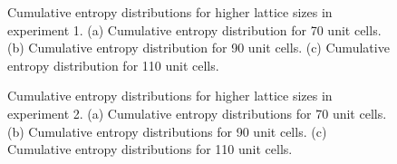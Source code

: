 \documentclass[10pt]{revtex4-1}
\newcommand\SSHOneCumulativeEntropyOneFourZero{./supp_ssh1_140_plot_cumulative_feature_importances.png}
\newcommand\SSHOneCumulativeEntropyOneEightZero{./supp_ssh1_180_plot_cumulative_feature_importances.png}
\newcommand\SSHOneCumulativeEntropyTwoTwoZero{./supp_ssh1_220_plot_cumulative_feature_importances.png}
\newcommand\SSHTwoCumulativeEntropyOneFourZero{./supp_ssh2_140_plot_cumulative_feature_importances.png}
\newcommand\SSHTwoCumulativeEntropyOneEightZero{./supp_ssh2_180_plot_cumulative_feature_importances.png}
\newcommand\SSHTwoCumulativeEntropyTwoTwoZero{./supp_ssh2_220_plot_cumulative_feature_importances.png}
\begin{document}
\pagebreak 

\begin{figure}
\centering
{}
\caption{Cumulative entropy distributions for higher lattice sizes in experiment 1. (a) Cumulative entropy distribution for 70 unit cells. (b) Cumulative entropy distribution for 90 unit cells. (c) Cumulative entropy distribution for 110 unit cells.}
\label{cdf1}
\end{figure}

\begin{figure}
\centering
{}
\caption{Cumulative entropy distributions for higher lattice sizes in experiment 2. (a) Cumulative entropy distributions for 70 unit cells. (b) Cumulative entropy distributions for 90 unit cells. (c) Cumulative entropy distributions for 110 unit cells.}
\label{cdf2}
\end{figure}
\end{document}
